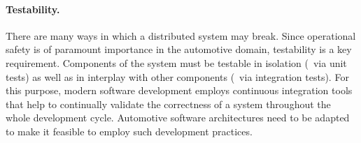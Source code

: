 \paragraph{Testability.}
There are many ways in which a distributed system may break. Since operational safety is of paramount importance in the automotive domain, testability is a key requirement. Components of the system must be testable in isolation (\eg\ via unit tests) as well as in interplay with other components (\eg\ via integration tests). For this purpose, modern software development employs continuous integration tools that help to continually validate the correctness of a system throughout the whole development cycle. Automotive software architectures need to be adapted to make it feasible to employ such development practices.


%
%
%
%
%
%
%
%
%
%
